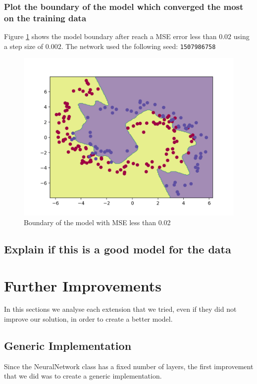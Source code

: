 \documentclass[11pt]{article}
\begin{document}
\subsubsection{Plot the boundary of the model which converged the most on the training data}
Figure \ref{fig: NN_MSE_002_boundary} shows the model boundary after reach a MSE error less than $0.02$ using a step size of $0.002$. The network used the following seed: \texttt{1507986758}
\begin{figure}[H]
\label{fig: NN_MSE_002_boundary}
\centering
\includegraphics[scale=0.6]{images/NN_MSE_002_boundary}	
\caption{Boundary of the model with MSE less than 0.02}
\end{figure}

\subsection{Explain if this is a good model for the data}

\section{Further Improvements}
In this sections we analyse each extension that we tried, even if they did not improve our solution, in order to create a better model.
\subsection{Generic Implementation}
Since the NeuralNetwork class has a fixed number of layers, the first improvement that we did was to create a generic implementation.
\end{document}
